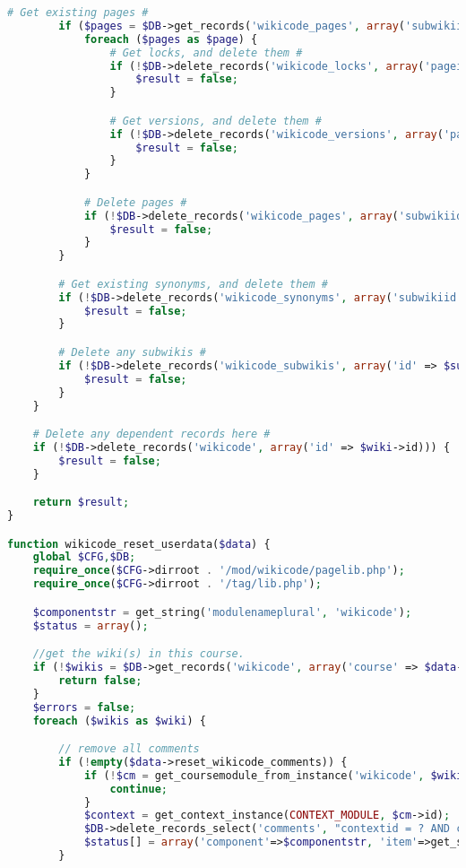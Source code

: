 \begin{lstlisting}[language=PHP]
        # Get existing pages #
        if ($pages = $DB->get_records('wikicode_pages', array('subwikiid' => $subwiki->id))) {
            foreach ($pages as $page) {
                # Get locks, and delete them #
                if (!$DB->delete_records('wikicode_locks', array('pageid' => $page->id), IGNORE_MISSING)) {
                    $result = false;
                }

                # Get versions, and delete them #
                if (!$DB->delete_records('wikicode_versions', array('pageid' => $page->id), IGNORE_MISSING)) {
                    $result = false;
                }
            }

            # Delete pages #
            if (!$DB->delete_records('wikicode_pages', array('subwikiid' => $subwiki->id), IGNORE_MISSING)) {
                $result = false;
            }
        }

        # Get existing synonyms, and delete them #
        if (!$DB->delete_records('wikicode_synonyms', array('subwikiid' => $subwiki->id), IGNORE_MISSING)) {
            $result = false;
        }

        # Delete any subwikis #
        if (!$DB->delete_records('wikicode_subwikis', array('id' => $subwiki->id), IGNORE_MISSING)) {
            $result = false;
        }
    }

    # Delete any dependent records here #
    if (!$DB->delete_records('wikicode', array('id' => $wiki->id))) {
        $result = false;
    }

    return $result;
}

function wikicode_reset_userdata($data) {
    global $CFG,$DB;
    require_once($CFG->dirroot . '/mod/wikicode/pagelib.php');
    require_once($CFG->dirroot . '/tag/lib.php');

    $componentstr = get_string('modulenameplural', 'wikicode');
    $status = array();

    //get the wiki(s) in this course.
    if (!$wikis = $DB->get_records('wikicode', array('course' => $data->courseid))) {
        return false;
    }
    $errors = false;
    foreach ($wikis as $wiki) {

        // remove all comments
        if (!empty($data->reset_wikicode_comments)) {
            if (!$cm = get_coursemodule_from_instance('wikicode', $wiki->id)) {
                continue;
            }
            $context = get_context_instance(CONTEXT_MODULE, $cm->id);
            $DB->delete_records_select('comments', "contextid = ? AND commentarea='wikicode_page'", array($context->id));
            $status[] = array('component'=>$componentstr, 'item'=>get_string('deleteallcomments'), 'error'=>false);
        }


\end{lstlisting}
